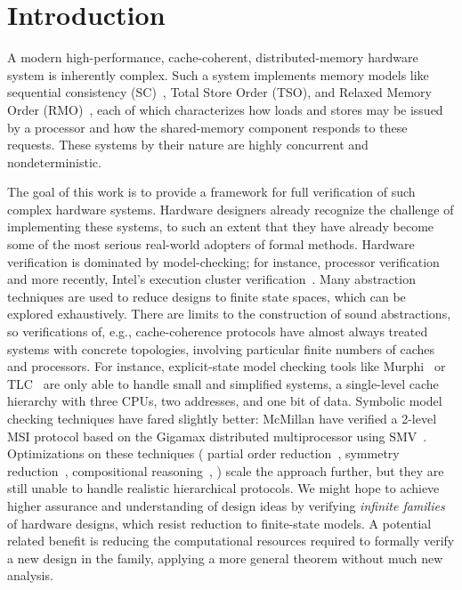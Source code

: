 \section{Introduction}
\label{sec:Introduction}

A modern high-performance, cache-coherent, distributed-memory hardware system is
inherently complex. Such a system implements memory models like sequential
consistency (SC)~\cite{lamport1979make}, Total Store Order (TSO), and
Relaxed Memory Order (RMO)~\cite{weaver1994sparc}, each
of which characterizes how loads and stores may be issued by a processor and
how the shared-memory component responds to these requests.  These systems by
their nature are highly concurrent and nondeterministic.

The goal of this work is to provide a framework for full verification of such
complex hardware systems. Hardware designers already recognize the challenge of
implementing these systems, to such an extent that they have already become some
of the most serious real-world adopters of formal methods.  Hardware
verification is dominated by model-checking; for instance, processor
verification ~\cite{burch1994automatic, mcmillan1998verification} and 
more recently, Intel's execution cluster verification~\cite{kaivola2009replacing}.
Many abstraction techniques are
used to reduce designs to finite state spaces, which can be explored
exhaustively.
 There are limits to the construction of sound abstractions, so
verifications of, e.g., cache-coherence protocols have almost always treated
systems with concrete topologies, involving particular finite numbers of caches
and processors. For instance, explicit-state model checking tools like
Murphi~\cite{murphi} or TLC~\cite{tlc} are only able to handle small and
simplified systems, \eg{} a single-level cache hierarchy with three CPUs, two
addresses, and one bit of data. Symbolic model checking techniques have fared
slightly better: McMillan \etal{} have verified a 2-level MSI protocol based on
the Gigamax distributed multiprocessor using SMV~\cite{gigamax}. Optimizations
on these techniques (\eg{} partial order reduction~\cite{part}, symmetry
reduction~\cite{sym1, sym2}, compositional reasoning~\cite{comp, Mccomp, mcc}, \etc{}) scale
the approach further, but they are still unable to handle realistic
hierarchical protocols. We might hope to achieve higher assurance and
understanding of design ideas by verifying \emph{infinite families} of hardware
designs, which resist reduction to finite-state models.  A potential related
benefit is reducing the computational resources required to formally verify a
new design in the family, applying a more general theorem without much new
analysis.

